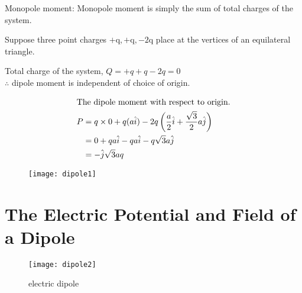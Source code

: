 \begin{note}
	Monopole moment: Monopole moment is simply the sum of total charges of the system.
\end{note}
\begin{exercise}
Suppose three point charges $+\mathrm{q},+\mathrm{q},-2 \mathrm{q}$ place at the vertices of an equilateral triangle.
\end{exercise}
\begin{answer}
	Total charge of the system, $Q=+q+q-2 q=0$ \\
	$ \therefore $ dipole moment is independent of choice of origin. \\
	\begin{minipage}{0.40\textwidth}
		\begin{align*}
		\intertext{The dipole moment with respect to origin.}
		P&=q \times 0+q(a \hat{i})-2 q\left(\frac{a}{2} \hat{i}+\frac{\sqrt{3}}{2} a \hat{j}\right) \\
		&=0+q a \hat{i}-q a \hat{i}-q \sqrt{3} a \hat{j}\\&=-\hat{j} \sqrt{3} a q
		\end{align*}
	\end{minipage}\hfill
	\begin{minipage}{0.40\textwidth}
	\begin{figure}[H]
		\centering
		\texttt{[image: dipole1]}
	\end{figure}
\end{minipage}

\end{answer}

\section{The Electric Potential and Field of a Dipole}
\begin{wrapfigure}{r}{0.20\textwidth}
	\begin{center}
		\texttt{[image: dipole2]}
	\end{center}
	\caption{electric dipole}
	\label{electric dipole}
\end{wrapfigure}

